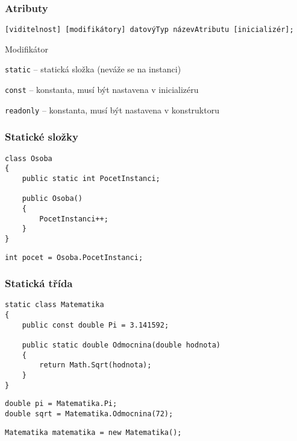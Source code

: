 \begin{frame}[fragile]
\frametitle{Atributy}

\begin{noteblock}{}
\begin{lstlisting}
[viditelnost] [modifikátory] datovýTyp názevAtributu [inicializér];
\end{lstlisting}
\end{noteblock}

\begin{bitemize}{Modifikátor}
\item \lstinline|static| -- statická složka (neváže se na instanci)
\item \lstinline|const| -- konstanta, musí být nastavena v inicializéru
\item \lstinline|readonly| -- konstanta, musí být nastavena v konstruktoru
\end{bitemize}
\end{frame}



\begin{frame}[fragile]
\frametitle{Statické složky}
\begin{yesblock}
\begin{lstlisting}
class Osoba
{
    public static int PocetInstanci;

    public Osoba() 
    { 
        PocetInstanci++; 
    }
}
\end{lstlisting}
\end{yesblock}

\begin{yesblock}
\begin{lstlisting}
int pocet = Osoba.PocetInstanci;
\end{lstlisting}
\end{yesblock}
\end{frame}



\begin{frame}[fragile]
\frametitle{Statická třída}
\begin{yesblock}
\begin{lstlisting}
static class Matematika
{
    public const double Pi = 3.141592;

    public static double Odmocnina(double hodnota)
    {
        return Math.Sqrt(hodnota);
    }
}
\end{lstlisting}
\end{yesblock}
\vskip -1.5mm
\begin{yesblock}
\begin{lstlisting}
double pi = Matematika.Pi;
double sqrt = Matematika.Odmocnina(72);
\end{lstlisting}
\end{yesblock}
\vskip -1.5mm
\begin{noblock}
\begin{lstlisting}
Matematika matematika = new Matematika();
\end{lstlisting}
\end{noblock}
\end{frame}



